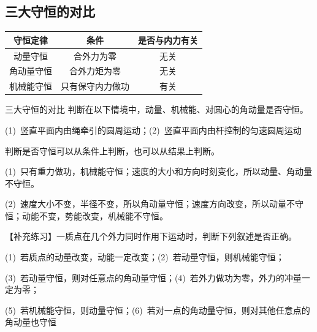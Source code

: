 \subsection{三大守恒的对比}

\begin{table}[htb]
    \centering
    \begin{tabular}{|c|c|c|}
        \hline
        守恒定律 & 条件 & 是否与内力有关\\
         \hline
        动量守恒 & 合外力为零 & 无关 \\
         \hline
        角动量守恒 & 合外力矩为零 & 无关 \\
         \hline
        机械能守恒 & 只有保守内力做功 & 有关 \\
         \hline
    \end{tabular}
\end{table}


\begin{example}{三大守恒的对比}
    \setlength{\parskip}{0.1em}
    判断在以下情境中，动量、机械能、对圆心的角动量是否守恒。

    (1)~竖直平面内由绳牵引的圆周运动；(2)~竖直平面内由杆控制的匀速圆周运动

    \tcblower

    \setlength{\parskip}{0.1em}

    判断是否守恒可以从条件上判断，也可以从结果上判断。

    (1)~只有重力做功，机械能守恒；速度的大小和方向时刻变化，所以动量、角动量不守恒。

    (2)~速度大小不变，半径不变，所以角动量守恒；速度方向改变，所以动量不守恒；动能不变，势能改变，机械能不守恒。
    
    \tcbline

    \setlength{\parskip}{0.1em}
    
    【补充练习】一质点在几个外力同时作用下运动时，判断下列叙述是否正确。
    
    (1)~若质点的动量改变，动能一定改变；(2)~若动量守恒，则机械能守恒；

    (3)~若动量守恒，则对任意点的角动量守恒；(4)~若外力做功为零，外力的冲量一定为零；
    
    (5)~若机械能守恒，则动量守恒；(6)~若对一点的角动量守恒，则对其他任意点的角动量也守恒

\end{example}

